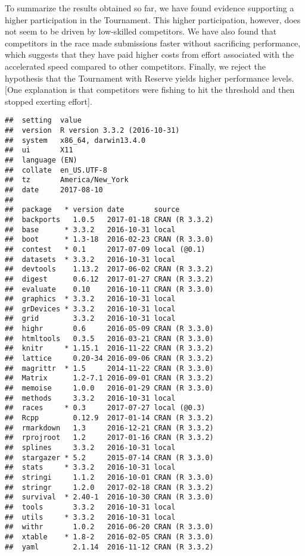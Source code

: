 \documentclass[10pt, titlepage]{article}
\begin{document}
To summarize the results obtained so far, we have found evidence
supporting a higher participation in the Tournament. This higher
participation, however, does not seem to be driven by low-skilled
competitors. We have also found that competitors in the race made
submissions faster without sacrificing performance, which suggests that
they have paid higher costs from effort associated with the accelerated
speed compared to other competitors. Finally, we reject the hypothesis
that the Tournament with Reserve yields higher performance levels.
{[}One explanation is that competitors were fishing to hit the threshold
and then stopped exerting effort{]}.

\begin{verbatim}
##  setting  value                       
##  version  R version 3.3.2 (2016-10-31)
##  system   x86_64, darwin13.4.0        
##  ui       X11                         
##  language (EN)                        
##  collate  en_US.UTF-8                 
##  tz       America/New_York            
##  date     2017-08-10                  
## 
##  package   * version date       source        
##  backports   1.0.5   2017-01-18 CRAN (R 3.3.2)
##  base      * 3.3.2   2016-10-31 local         
##  boot      * 1.3-18  2016-02-23 CRAN (R 3.3.0)
##  contest   * 0.1     2017-07-09 local (@0.1)  
##  datasets  * 3.3.2   2016-10-31 local         
##  devtools    1.13.2  2017-06-02 CRAN (R 3.3.2)
##  digest      0.6.12  2017-01-27 CRAN (R 3.3.2)
##  evaluate    0.10    2016-10-11 CRAN (R 3.3.0)
##  graphics  * 3.3.2   2016-10-31 local         
##  grDevices * 3.3.2   2016-10-31 local         
##  grid        3.3.2   2016-10-31 local         
##  highr       0.6     2016-05-09 CRAN (R 3.3.0)
##  htmltools   0.3.5   2016-03-21 CRAN (R 3.3.0)
##  knitr     * 1.15.1  2016-11-22 CRAN (R 3.3.2)
##  lattice     0.20-34 2016-09-06 CRAN (R 3.3.2)
##  magrittr  * 1.5     2014-11-22 CRAN (R 3.3.0)
##  Matrix      1.2-7.1 2016-09-01 CRAN (R 3.3.2)
##  memoise     1.0.0   2016-01-29 CRAN (R 3.3.0)
##  methods     3.3.2   2016-10-31 local         
##  races     * 0.3     2017-07-27 local (@0.3)  
##  Rcpp        0.12.9  2017-01-14 CRAN (R 3.3.2)
##  rmarkdown   1.3     2016-12-21 CRAN (R 3.3.2)
##  rprojroot   1.2     2017-01-16 CRAN (R 3.3.2)
##  splines     3.3.2   2016-10-31 local         
##  stargazer * 5.2     2015-07-14 CRAN (R 3.3.0)
##  stats     * 3.3.2   2016-10-31 local         
##  stringi     1.1.2   2016-10-01 CRAN (R 3.3.0)
##  stringr     1.2.0   2017-02-18 CRAN (R 3.3.2)
##  survival  * 2.40-1  2016-10-30 CRAN (R 3.3.0)
##  tools       3.3.2   2016-10-31 local         
##  utils     * 3.3.2   2016-10-31 local         
##  withr       1.0.2   2016-06-20 CRAN (R 3.3.0)
##  xtable    * 1.8-2   2016-02-05 CRAN (R 3.3.0)
##  yaml        2.1.14  2016-11-12 CRAN (R 3.3.2)
\end{verbatim}
\end{document}
